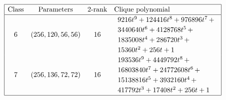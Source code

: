 \documentclass[12pt,a4paper]{article}
\begin{document}
\newpage
\small{}
\begin{align*}
\def\arraystretch{1.2}
\begin{array}{|cccl|}
\hline
\text{Class} &
\text{Parameters} &
\text{2-rank} &
\text{Clique polynomial}
\\
\hline
6 &
(256, 120, 56, 56) &
16 &
\begin{array}{l}
9216t^{9} + 124416t^{8} + 976896t^{7}
\,+
\\
 3440640t^{6} + 4128768t^{5}
\,+
\\
 1835008t^{4} + 286720t^{3}
\,+
\\
 15360t^{2} + 256t + 1
\end{array}
\\
7 &
(256, 136, 72, 72) &
16 &
\begin{array}{l}
193536t^{9} + 4449792t^{8}
\,+
\\
 16803840t^{7} + 24772608t^{6}
\,+
\\
 15138816t^{5} + 3932160t^{4}
\,+
\\
 417792t^{3} + 17408t^{2} + 256t + 1
\end{array}
\\
\hline
\end{array}
\end{align*}
\end{document}
